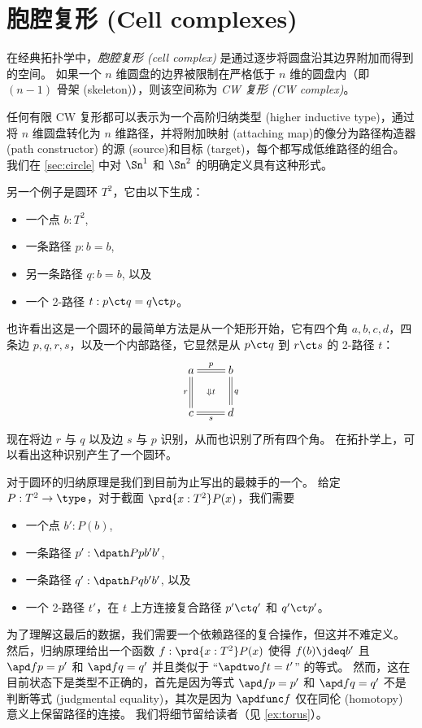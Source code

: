 %
\section{胞腔复形 (Cell complexes)}
\label{sec:cell-complexes}

%
%
在经典拓扑学中，\emph{胞腔复形 (cell complex)} 是通过逐步将圆盘沿其边界附加而得到的空间。
如果一个 $n$ 维圆盘的边界被限制在严格低于 $n$ 维的圆盘内（即 $(n-1)$ 骨架 (skeleton)），则该空间称为 \emph{CW 复形 (CW complex)}。

任何有限 CW 复形都可以表示为一个高阶归纳类型 (higher inductive type)，通过将 $n$ 维圆盘转化为 $n$ 维路径，并将附加映射 (attaching map)的像分为路径构造器 (path constructor) 的源 (source)和目标 (target)，每个都写成低维路径的组合。
我们在 \cref{sec:circle} 中对 $\Sn^1$ 和 $\Sn^2$ 的明确定义具有这种形式。

%
另一个例子是圆环 $T^2$，它由以下生成：
\begin{itemize}
  \item 一个点 $b:T^2$,
  \item 一条路径 $p:b=b$,
  \item 另一条路径 $q:b=b$, 以及
  \item 一个 2-路径 $t: p\ct q = q \ct p$。
\end{itemize}
也许看出这是一个圆环的最简单方法是从一个矩形开始，它有四个角 $a,b,c,d$，四条边 $p,q,r,s$，以及一个内部路径，它显然是从 $p\ct q$ 到 $r\ct s$ 的 2-路径 $t$：
\begin{equation*}
  \xymatrix{
    a\ar@{=}[r]^p\ar@{=}[d]_r \ar@{}[dr]|{\Downarrow t} &
    b\ar@{=}[d]^q\\
    c\ar@{=}[r]_s &
    d
  }
\end{equation*}
现在将边 $r$ 与 $q$ 以及边 $s$ 与 $p$ 识别，从而也识别了所有四个角。
在拓扑学上，可以看出这种识别产生了一个圆环。

%
%
对于圆环的归纳原理是我们到目前为止写出的最棘手的一个。
给定 $P:T^2\to\type$，对于截面 $\prd{x:T^2} P(x)$，我们需要
\begin{itemize}
  \item 一个点 $b':P(b)$,
  \item 一条路径 $p' : \dpath P p {b'} {b'}$,
  \item 一条路径 $q' : \dpath P q {b'} {b'}$, 以及
  \item 一个 2-路径 $t'$，在 $t$ 上方连接复合路径 $p'\ct q'$ 和 $q'\ct p'$。
\end{itemize}
为了理解这最后的数据，我们需要一个依赖路径的复合操作，但这并不难定义。
然后，归纳原理给出一个函数 $f:\prd{x:T^2} P(x)$ 使得 $f(b)\jdeq b'$ 且 $\apd f {p} = p'$ 和 $\apd f {q} = q'$ 并且类似于 ``$\apdtwo f t = t'$'' 的等式。
然而，这在目前状态下是类型不正确的，首先是因为等式 $\apd f {p} = p'$ 和 $\apd f {q} = q'$ 不是判断等式 (judgmental equality)，其次是因为 $\apdfunc f$ 仅在同伦 (homotopy) 意义上保留路径的连接。
我们将细节留给读者（见 \cref{ex:torus}）。

